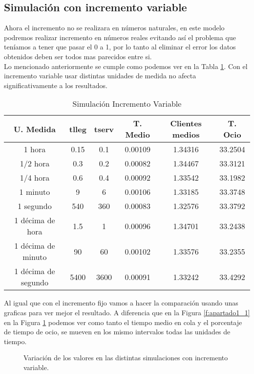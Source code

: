 \documentclass[12pt,a4paper]{article}
\begin{document}
\subsection{Simulación con incremento variable}
Ahora el incremento no se realizara en números naturales, en este modelo podremos realizar incremento en números reales evitando así el problema que teníamos a tener que pasar el 0 a 1, por lo tanto al eliminar el error los datos obtenidos deben ser todos mas parecidos entre si. \\
Lo mencionado anteriormente se cumple como podemos ver en la Tabla \ref{tab:iincrementovar}. Con el incremento variable usar distintas unidades de medida no afecta significativamente a los resultados. 
\begin{table}[H]
	\centering	
	\begin{tabular}{cccccc} \toprule
		{U. Medida}&{tlleg} & {tserv} & {T. Medio} & {Clientes medios} & {T. Ocio} \\ \midrule
		1 hora & 0.15  & 0.1 &  0.00109 & 1.34316 &  33.2504 \\
		1/2 hora & 0.3  & 0.2 & 0.00082 &  1.34467 & 33.3121 \\
		1/4 hora  & 0.6 & 0.4 & 0.00092 & 1.33542 & 33.1982 \\		\midrule
		1 minuto & 9  & 6 & 0.00106 & 1.33185 & 33.3748 \\
		1 segundo  & 540 & 360 & 0.00083 & 1.32576  & 33.3792 \\		\midrule
		1 décima de hora  & 1.5 & 1 & 0.00096 & 1.34701  & 33.2438 \\
		1 décima de minuto  & 90 & 60 & 0.00102 & 1.33576  & 33.2355 \\
		1 décima de segundo  & 5400 & 3600 & 0.00091 & 1.33242  & 33.4292 \\ 
		\midrule
		
	\end{tabular}
	\caption{Simulación Incremento Variable} \label{tab:iincrementovar}
\end{table}
Al igual que con el incremento fijo vamos a hacer la comparación usando unas graficas para ver mejor el resultado. A diferencia que en la Figura \ref{f:apartado1_1} en la Figura \ref{f:apartado1_2} podemos ver como tanto el tiempo medio en cola y el porcentaje de tiempo de ocio, se mueven en los mismo intervalos todas las unidades de tiempo. 
\begin{figure}[H]
	\centering
	\caption{Variación de los valores en las distintas simulaciones con incremento variable.}
	
	\label{f:apartado1_2}
\end{figure}
\end{document}
